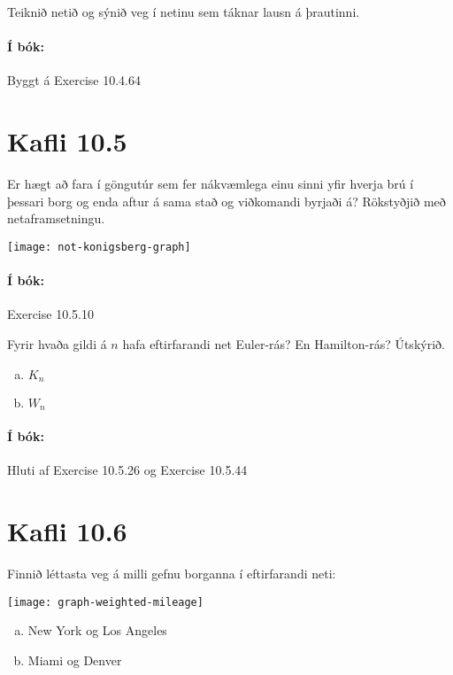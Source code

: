 \documentclass{exam}
\begin{document}
\begin{questions}
Teiknið netið og sýnið veg í netinu sem táknar lausn á þrautinni.

\paragraph{Í bók:} Byggt á Exercise 10.4.64

\newpage

\section{Kafli 10.5}

\question Er hægt að fara í göngutúr sem fer nákvæmlega einu sinni yfir hverja brú í þessari borg og enda aftur á sama stað og viðkomandi byrjaði á? Rökstyðjið með netaframsetningu.

\begin{center}
\texttt{[image: not-konigsberg-graph]}
\end{center}

\paragraph{Í bók:} Exercise 10.5.10

\question Fyrir hvaða gildi á $n$ hafa eftirfarandi net Euler-rás? En Hamilton-rás? Útskýrið.

\begin{enumerate}[a)]
 \item $K_n$
 \item $W_n$
\end{enumerate}

\paragraph{Í bók:} Hluti af Exercise 10.5.26 og Exercise 10.5.44

\section{Kafli 10.6}

\question Finnið léttasta veg á milli gefnu borganna í eftirfarandi neti:

\begin{center}
\texttt{[image: graph-weighted-mileage]}
\end{center}

\begin{enumerate}[a)]
 \item New York og Los Angeles
 \item Miami og Denver
\end{enumerate}


\end{questions}
\end{document}
